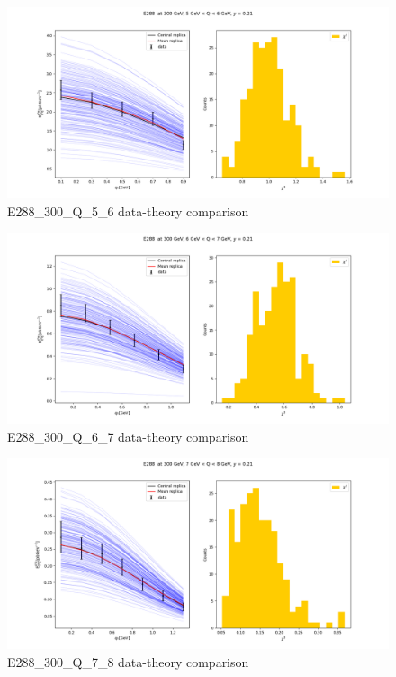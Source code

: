\documentclass[
]{article}
\begin{document}
\begin{figure}
\centering
\includegraphics{pngplots/E288_300_Q_5_6.png}
\caption{E288\_300\_Q\_5\_6 data-theory comparison}
\end{figure}

\begin{figure}
\centering
\includegraphics{pngplots/E288_300_Q_6_7.png}
\caption{E288\_300\_Q\_6\_7 data-theory comparison}
\end{figure}

\begin{figure}
\centering
\includegraphics{pngplots/E288_300_Q_7_8.png}
\caption{E288\_300\_Q\_7\_8 data-theory comparison}
\end{figure}
\end{document}
